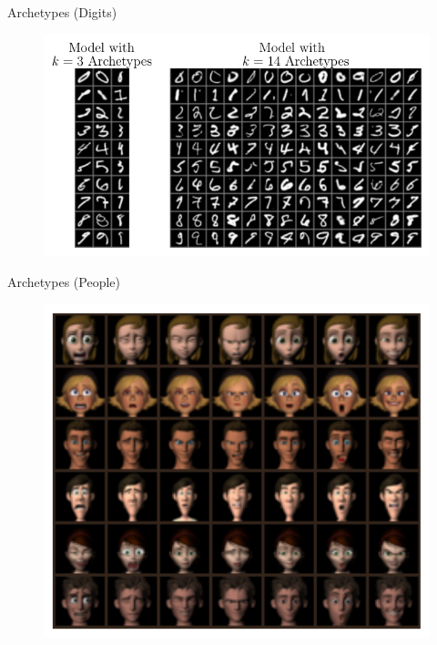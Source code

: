\documentclass[aspectratio=169]{beamer}
\begin{document}
\begin{frame}{Archetypes (Digits)}
\begin{figure}[htpb]
	\includegraphics[height=0.7\textheight]{beamer-figures/samples/archetypes_emnist.pdf}
\end{figure}
\end{frame}

\begin{frame}{Archetypes (People)}
\begin{figure}[htpb]
	\includegraphics[height=0.7\textheight]{figures/samples/archetypes_ferg_7.pdf}
\end{figure}
\end{frame}
\end{document}
